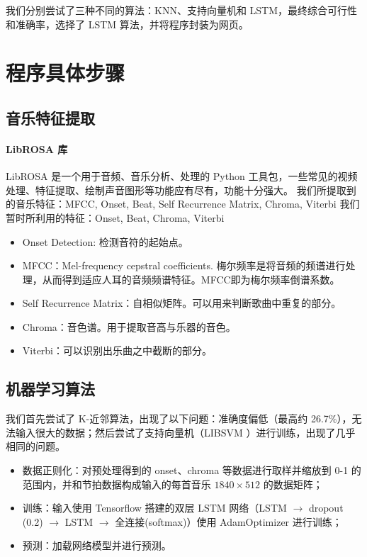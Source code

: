 \documentclass[a4paper,utf8,10pt]{article}
\newcommand{\sept}{\setlength\itemsep{-4pt}}
\begin{document}
我们分别尝试了三种不同的算法：KNN、支持向量机和 LSTM，最终综合可行性和准确率，选择了 LSTM 算法，并将程序封装为网页。

\section{程序具体步骤}
\subsection{音乐特征提取}
\paragraph{LibROSA 库} LibROSA 是一个用于音频、音乐分析、处理的 Python 工具包，一些常见的视频处理、特征提取、绘制声音图形等功能应有尽有，功能十分强大。
我们所提取到的音乐特征：MFCC, Onset, Beat, Self Recurrence Matrix, Chroma, Viterbi
我们暂时所利用的特征：Onset, Beat, Chroma, Viterbi

\noindent\begin{itemize}
  \sept
  \item Onset Detection: 检测音符的起始点。
  \item MFCC：Mel-frequency cepstral coefficients. 梅尔频率是将音频的频谱进行处理，从而得到适应人耳的音频频谱特征。MFCC即为梅尔频率倒谱系数。
  \item Self Recurrence Matrix：自相似矩阵。可以用来判断歌曲中重复的部分。
  \item Chroma：音色谱。用于提取音高与乐器的音色。
  \item Viterbi：可以识别出乐曲之中截断的部分。
\end{itemize}

\subsection{机器学习算法}

我们首先尝试了 K-近邻算法，出现了以下问题：准确度偏低（最高约 26.7\%），无法输入很大的数据；然后尝试了支持向量机（LIBSVM \cite{CC01a}）进行训练，出现了几乎相同的问题。

\noindent\begin{itemize}
  \sept
  \item 数据正则化：对预处理得到的 onset、chroma 等数据进行取样并缩放到 0-1 的范围内，并和节拍数据构成输入的每首音乐 $1840\times 512$ 的数据矩阵；
  \item 训练：输入使用 Tensorflow 搭建的双层 LSTM 网络（LSTM $\rightarrow$ dropout (0.2) $\rightarrow$ LSTM $\rightarrow$ 全连接(softmax)）使用 AdamOptimizer 进行训练；
  \item 预测：加载网络模型并进行预测。
\end{itemize}
\end{document}

